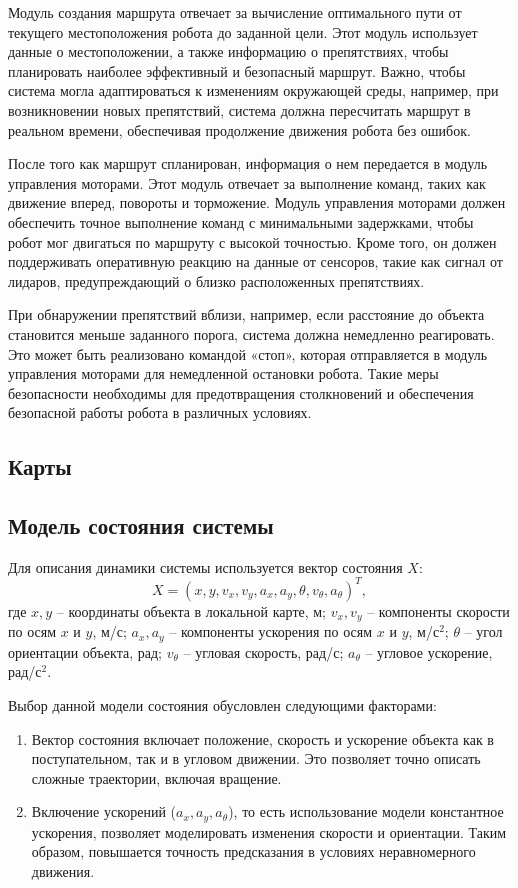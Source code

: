 Модуль создания маршрута отвечает за вычисление оптимального пути от текущего
местоположения робота до заданной цели. Этот модуль использует данные о
местоположении, а также информацию о препятствиях, чтобы планировать наиболее
эффективный и безопасный маршрут. Важно, чтобы система могла адаптироваться к
изменениям окружающей среды, например, при возникновении новых препятствий,
система должна пересчитать маршрут в реальном времени, обеспечивая продолжение
движения робота без ошибок.

После того как маршрут спланирован, информация о нем передается в модуль
управления моторами. Этот модуль отвечает за выполнение команд, таких как
движение вперед, повороты и торможение. Модуль управления моторами должен
обеспечить точное выполнение команд с минимальными задержками, чтобы робот мог
двигаться по маршруту с высокой точностью. Кроме того, он должен поддерживать
оперативную реакцию на данные от сенсоров, такие как сигнал от лидаров,
предупреждающий о близко расположенных препятствиях.

При обнаружении препятствий вблизи, например, если расстояние до объекта
становится меньше заданного порога, система должна немедленно реагировать. Это
может быть реализовано командой «стоп», которая отправляется в модуль управления
моторами для немедленной остановки робота. Такие меры безопасности необходимы
для предотвращения столкновений и обеспечения безопасной работы робота в
различных условиях.


\subsection{Карты}


\subsection{Модель состояния системы}

Для описания динамики системы используется вектор состояния \(X\):
\[
{X} = (x, y, v_x, v_y, a_x, a_y, \theta, v_\theta, a_\theta)^T,
\]
где
     $x, y$ -- координаты объекта в локальной карте, м;
     $v_x, v_y$ -- компоненты скорости по осям $x$ и $y$, м/с;
     $a_x, a_y$ -- компоненты ускорения по осям $x$ и $y$, м/с${}^2$;
     $\theta$ -- угол ориентации объекта, $рад$;
     $v_\theta$ -- угловая скорость, рад/с;
     $a_\theta$ -- угловое ускорение, рад/с${}^2$.

Выбор данной модели состояния обусловлен следующими факторами:
\begin{enumerate}[label=\arabic*]
    \item Вектор состояния включает положение, скорость и ускорение объекта как в поступательном, так и в угловом движении. 
	   Это позволяет точно описать сложные траектории, включая вращение.
    \item Включение ускорений ($a_x, a_y, a_\theta$), то есть использование модели константное ускорения,
	  позволяет моделировать изменения скорости и ориентации. Таким образом,
	повышается точность предсказания в условиях неравномерного движения.
\end{enumerate}

